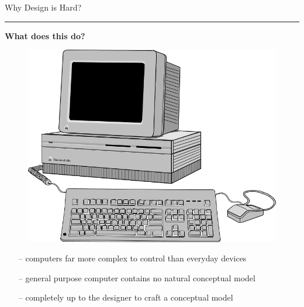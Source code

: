 \documentclass[pdf]{beamer}
\begin{document}
\begin{frame}
	{Why Design is Hard?}{\textcolor{red}{\rule{12cm}{1.2pt}}}
	
\large{\textbf{What does this do?}}

    \begin{figure}
      \includegraphics[scale=0.25]{50_picture.png}
  	\end{figure}
  	
   \begin{itemize}
        \item[--]computers far more complex to control than everyday devices
		\item[--]general purpose computer contains no natural conceptual model
		\item[--]completely up to the designer to craft a conceptual model 
   \end{itemize}
   
\end{frame}



\end{document}
